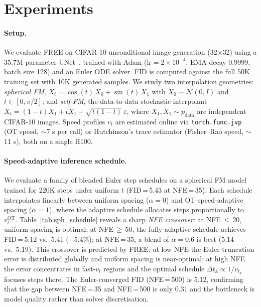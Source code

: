 \section{Experiments}
\label{sec:experiments}

\paragraph{Setup.}
We evaluate FREE on CIFAR-10 unconditional image generation (32$\times$32) using a 35.7M-parameter UNet~\citep{ho2020ddpm}, trained with Adam ($\text{lr} = 2\times10^{-4}$, EMA decay 0.9999, batch size 128) and an Euler ODE solver.
FID is computed against the full 50K training set with 10K generated samples.
We study two interpolation geometries: \emph{spherical FM}, $X_t = \cos(t)\,X_0 + \sin(t)\,X_1$ with $X_0 \sim \mathcal{N}(0,I)$ and $t \in [0, \pi/2]$; and \emph{self-FM}, the data-to-data stochastic interpolant
$X_t = (1-t)X_1 + t\tilde{X}_1 + \sqrt{t(1-t)}\,\varepsilon$,
where $X_1, \tilde{X}_1 \!\sim\! p_{\mathrm{data}}$ are independent CIFAR-10 images.
Speed profiles $v_t$ are estimated online via \texttt{torch.func.jvp} (OT speed, $\sim$7 s per call) or Hutchinson's trace estimator (Fisher--Rao speed, $\sim$11 s), both on a single H100.

\paragraph{Speed-adaptive inference schedule.}
We evaluate a family of blended Euler step schedules on a spherical FM model trained for 220K steps under uniform $t$ (FID\,=\,5.43 at NFE\,=\,35).
Each schedule interpolates linearly between uniform spacing ($\alpha\!=\!0$) and OT-speed-adaptive spacing ($\alpha\!=\!1$), where the adaptive schedule allocates steps proportionally to $v_t^{\mathrm{OT}}$.
Table~\ref{tab:sph_schedule} reveals a sharp \emph{NFE crossover}: at NFE\,$\leq$\,20, uniform spacing is optimal; at NFE\,$\geq$\,50, the fully adaptive schedule achieves FID\,=\,5.12 vs.\ 5.41 ($-5.4\%$); at NFE\,=\,35, a blend of $\alpha\!=\!0.6$ is best (5.14 vs.\ 5.19).
This crossover is predicted by FREE: at low NFE the Euler truncation error is distributed globally and uniform spacing is near-optimal; at high NFE the error concentrates in fast-$v_t$ regions and the optimal schedule $\Delta t_k \propto 1/v_{t_k}$ focuses steps there.
The Euler-converged FID (NFE\,=\,500) is 5.12, confirming that the gap between NFE\,=\,35 and NFE\,=\,500 is only 0.31 and the bottleneck is model quality rather than solver discretisation.

